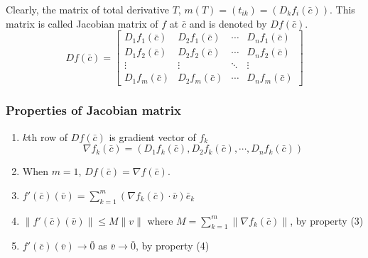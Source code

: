 Clearly, the matrix of total derivative $T$, $m(T) = (t_{ik}) = (D_k f_i(\bar{c}))$.
This matrix is called Jacobian matrix of $f$ at $\bar{c}$ and is denoted by $Df(\bar{c})$.
\[ Df(\bar{c}) = \begin{bmatrix} D_1 f_1(\bar{c}) & D_2 f_1(\bar{c}) & \cdots & D_n f_1(\bar{c}) \\ D_1 f_2(\bar{c}) & D_2 f_2(\bar{c}) & \cdots & D_n f_2(\bar{c}) \\ \vdots & \vdots & \ddots & \vdots \\ D_1 f_m(\bar{c}) & D_2 f_m(\bar{c}) & \cdots & D_n f_m(\bar{c}) \end{bmatrix} \]

\subsubsection{Properties of Jacobian matrix}
\begin{enumerate}
	\item $k$th row of $Df(\bar{c})$ is gradient vector of $f_k$
		\[\nabla f_k(\bar{c}) = (D_1f_k(\bar{c}),D_2f_k(\bar{c}),\cdots,D_nf_k(\bar{c}))\]
	\item When $m = 1$, $Df(\bar{c}) = \nabla f(\bar{c})$.
	\item $f'(\bar{c})(\bar{v}) = \sum_{k=1}^m \left(\nabla f_k(\bar{c}) \cdot \bar{v}\right) \bar{e}_k$
	\item $\|f'(\bar{c})(\bar{v})\| \le M\|v\|$ where $M = \sum_{k=1}^m \|\nabla f_k(\bar{c})\| $, by property (3)
	\item $f'(\bar{c})(\bar{v}) \to \bar{0}$ as $\bar{v} \to \bar{0}$, by property (4)
\end{enumerate}

